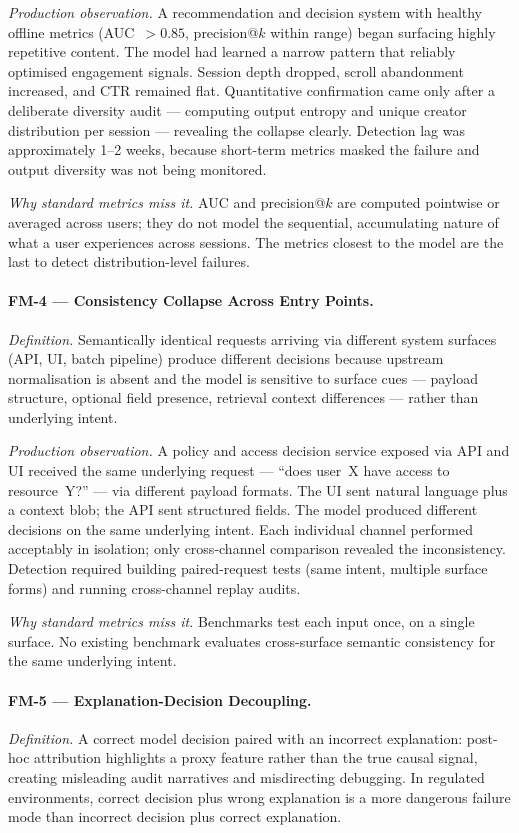 \documentclass{article}
\begin{document}
\textit{Production observation.}  A recommendation and decision system with
healthy offline metrics (AUC~$>0.85$, precision@$k$ within range) began
surfacing highly repetitive content.  The model had learned a narrow pattern
that reliably optimised engagement signals.  Session depth dropped, scroll
abandonment increased, and CTR remained flat.  Quantitative confirmation came
only after a deliberate diversity audit --- computing output entropy and unique
creator distribution per session --- revealing the collapse clearly.  Detection
lag was approximately 1--2 weeks, because short-term metrics masked the failure
and output diversity was not being monitored.

\textit{Why standard metrics miss it.}  AUC and precision@$k$ are computed
pointwise or averaged across users; they do not model the sequential,
accumulating nature of what a user experiences across sessions.  The metrics
closest to the model are the last to detect distribution-level failures.

\paragraph{FM-4 --- Consistency Collapse Across Entry Points.}
\textit{Definition.}  Semantically identical requests arriving via different
system surfaces (API, UI, batch pipeline) produce different decisions because
upstream normalisation is absent and the model is sensitive to surface cues ---
payload structure, optional field presence, retrieval context differences ---
rather than underlying intent.

\textit{Production observation.}  A policy and access decision service exposed
via API and UI received the same underlying request --- ``does user~X have
access to resource~Y?'' --- via different payload formats.  The UI sent natural
language plus a context blob; the API sent structured fields.  The model
produced different decisions on the same underlying intent.  Each individual
channel performed acceptably in isolation; only cross-channel comparison
revealed the inconsistency.  Detection required building paired-request tests
(same intent, multiple surface forms) and running cross-channel replay audits.

\textit{Why standard metrics miss it.}  Benchmarks test each input once, on a
single surface.  No existing benchmark evaluates cross-surface semantic
consistency for the same underlying intent.

\paragraph{FM-5 --- Explanation-Decision Decoupling.}
\textit{Definition.}  A correct model decision paired with an incorrect
explanation: post-hoc attribution highlights a proxy feature rather than the
true causal signal, creating misleading audit narratives and misdirecting
debugging.  In regulated environments, correct decision plus wrong explanation
is a more dangerous failure mode than incorrect decision plus correct
explanation.
\end{document}
